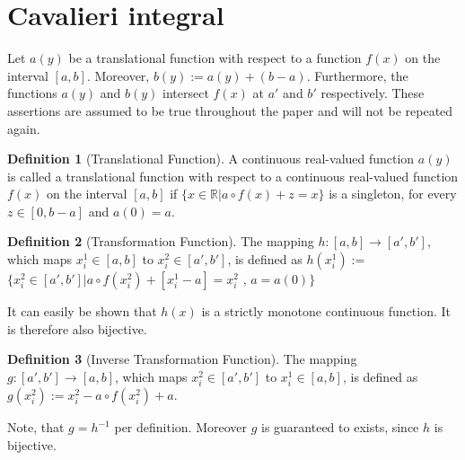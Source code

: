 \documentclass{article}
\theoremstyle{theorem}
\theoremstyle{definition}
\newtheorem*{definition}{Definition}
\begin{document}
\section{Cavalieri integral}
Let $a(y)$ be a translational function with respect to a function $f(x)$ on the interval $[a,b]$. Moreover, $b(y) := a(y) + (b-a)$. Furthermore, the functions $a(y)$ and $b(y)$ intersect $f(x)$ at $a'$ and $b'$ respectively.
These assertions are assumed to be true throughout the paper and will not be repeated again.

\begin{definition}[Translational Function]
A continuous real-valued function $a(y)$ is called a translational function with respect to a continuous real-valued function $f(x)$ on the interval $[a,b]$ if 
$\{x\in\mathbb{R}|a\circ f(x) + z = x\}$ is a singleton, for every $z\in[0,b-a]$ and $a(0) = a$.
\end{definition}

\begin{definition}[Transformation Function]
The mapping $h : [a, b] \rightarrow [a',b']$, which maps $x_i^1 \in [a, b]$ to $x_i^2 \in [a',b']$, is defined as
$h(x_i^1) :=$ $\{x_i^2 \in [a' ,b'] | a\circ f(x_i^2) + [x_i^1 - a] = x_i^2$ , $a = a(0)\}$
\end{definition}

\noindent
It can easily be shown that $h(x)$ is a strictly monotone continuous function. It is therefore also bijective. 

\begin{definition}[Inverse Transformation Function]
The mapping $g:[a′, b′] \rightarrow [a, b]$, which maps $x_i^2 \in [a' , b']$ to $x_i^1\in [a, b]$,
is defined as $g(x_i^2) := x_i^2 - a \circ f (x_i^2) + a$.
\end{definition}

\noindent
Note, that $g = h^{-1}$ per definition. Moreover $g$ is guaranteed to exists, since $h$ is bijective. 
\end{document}

